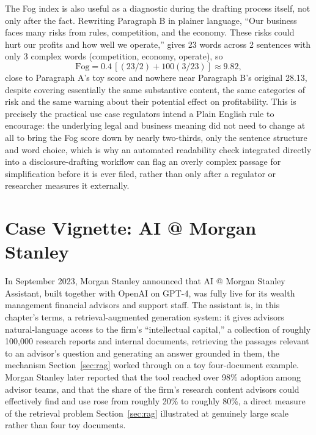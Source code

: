 \documentclass[../ai_in_finance]{subfiles}
\begin{document}
The Fog index is also useful as a diagnostic during the drafting process itself, not only after the fact. Rewriting Paragraph B in plainer language, ``Our business faces many risks from rules, competition, and the economy. These risks could hurt our profits and how well we operate,'' gives 23 words across 2 sentences with only 3 complex words (competition, economy, operate), so
\begin{equation*}
\text{Fog} = 0.4\,[(23/2) + 100(3/23)] \approx 9.82,
\end{equation*}
close to Paragraph A's toy score and nowhere near Paragraph B's original 28.13, despite covering essentially the same substantive content, the same categories of risk and the same warning about their potential effect on profitability. This is precisely the practical use case regulators intend a Plain English rule to encourage: the underlying legal and business meaning did not need to change at all to bring the Fog score down by nearly two-thirds, only the sentence structure and word choice, which is why an automated readability check integrated directly into a disclosure-drafting workflow can flag an overly complex passage for simplification before it is ever filed, rather than only after a regulator or researcher measures it externally.

\section{Case Vignette: AI @ Morgan Stanley}

In September 2023, Morgan Stanley announced that AI @ Morgan Stanley Assistant, built together with OpenAI on GPT-4, was fully live for its wealth management financial advisors and support staff. The assistant is, in this chapter's terms, a retrieval-augmented generation system: it gives advisors natural-language access to the firm's ``intellectual capital,'' a collection of roughly 100,000 research reports and internal documents, retrieving the passages relevant to an advisor's question and generating an answer grounded in them, the mechanism Section~\ref{sec:rag} worked through on a toy four-document example. Morgan Stanley later reported that the tool reached over 98\% adoption among advisor teams, and that the share of the firm's research content advisors could effectively find and use rose from roughly 20\% to roughly 80\%, a direct measure of the retrieval problem Section~\ref{sec:rag} illustrated at genuinely large scale rather than four toy documents.
\end{document}
